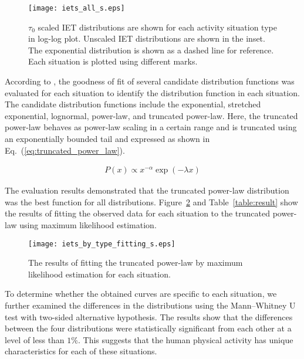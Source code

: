 \documentclass{bmcart}
\begin{document}
\begin{figure}[ht]
\centering
 \texttt{[image: iets\_all\_s.eps]}
 \caption{$\tau_0$ scaled IET distributions are shown for each activity situation type in log-log plot. Unscaled IET distributions are shown in the inset. The exponential distribution is shown as a dashed line for reference. Each situation is plotted using different marks.}
 \label{fig:iets_all}
\end{figure}


According to \cite{10.1371/journal.pone.0085777, doi:10.1137/070710111}, the goodness of ﬁt of several candidate distribution functions was evaluated for each situation to identify the distribution function in each situation. The candidate distribution functions include the exponential, stretched exponential, lognormal, power-law, and truncated power-law. Here, the truncated power-law behaves as power-law scaling in a certain range and is truncated using an exponentially bounded tail and expressed as shown in Eq.~(\ref{eq:truncated_power_law}).

\begin{eqnarray}
P(x) \propto x^{-\alpha} \exp{\left(-\lambda x\right)}
\label{eq:truncated_power_law}
\end{eqnarray}

The evaluation results demonstrated that the truncated power-law distribution was the best function for all distributions. Figure~\ref{fig:iets_dist_by_type} and Table~\ref{table:result} show the results of ﬁtting the observed data for each situation to the truncated power-law using maximum likelihood estimation.

\begin{figure}[ht]
\centering
 \texttt{[image: iets\_by\_type\_fitting\_s.eps]}
 \caption{The results of fitting the truncated power-law by maximum likelihood estimation for each situation.}
 \label{fig:iets_dist_by_type}
\end{figure}

To determine whether the obtained curves are specific to each situation, we further examined the differences in the distributions using the Mann–Whitney U test with two-sided alternative hypothesis. The results show that the differences between the four distributions were statistically significant from each other at a level of less than $1\%$. This suggests that the human physical activity has unique characteristics for each of these situations.
\end{document}
